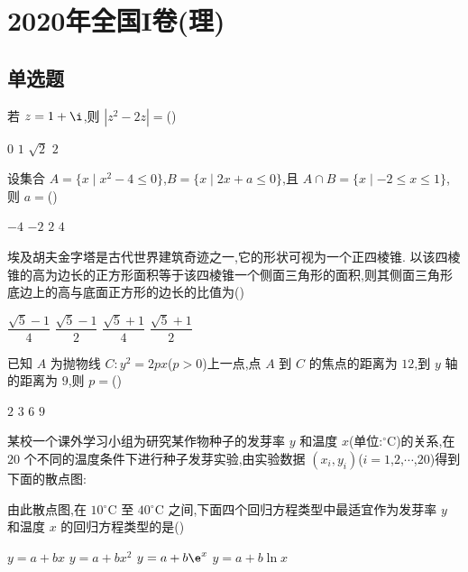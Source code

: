 \chapter{2020年全国I卷(理)}

\section{单选题}

\begin{problem}
若 \(z=1+\i\),则 \(\left\lvert z^2-2z \right\rvert=\)(\quad)

\choices
    {\(0\)}
    {\(1\)}
    {\(\sqrt{2}\)}
    {\(2\)}

\end{problem}

\begin{problem}
设集合 \(A=\{x\mid x^2-4\le 0\}\),\(B=\{x\mid 2x+a\le 0\}\),且 \(A\cap B=\{x\mid -2\le x\le 1\}\),则 \(a=\)(\quad)

\choices
    {\(-4\)}
    {\(-2\)}
    {\(2\)}
    {\(4\)}

\end{problem}

\begin{problem}
埃及胡夫金字塔是古代世界建筑奇迹之一,它的形状可视为一个正四棱锥. 以该四棱锥的高为边长的正方形面积等于该四棱锥一个侧面三角形的面积,则其侧面三角形底边上的高与底面正方形的边长的比值为(\quad)


\choices
    {\(\dfrac{\sqrt{5}-1}{4}\)}
    {\(\dfrac{\sqrt{5}-1}{2}\)}
    {\(\dfrac{\sqrt{5}+1}{4}\)}
    {\(\dfrac{\sqrt{5}+1}{2}\)}

\end{problem}

\begin{problem}
已知 \(A\) 为抛物线 \(C:y^2=2px\)(\(p>0\))上一点,点 \(A\) 到 \(C\) 的焦点的距离为 \(12\),到 \(y\) 轴的距离为 \(9\),则 \(p=\)(\quad)

\choices
    {\(2\)}
    {\(3\)}
    {\(6\)}
    {\(9\)}

\end{problem}

\begin{problem}
某校一个课外学习小组为研究某作物种子的发芽率 \(y\) 和温度 \(x\)(单位:\({}^\circ\mathrm{C}\))的关系,在 \(20\) 个不同的温度条件下进行种子发芽实验,由实验数据 \(\left( x_i,y_i \right)\)(\(i=1\),\(2\),\(\cdots\),\(20\))得到下面的散点图:


由此散点图,在 \(10{}^\circ\mathrm{C}\) 至 \(40{}^\circ\mathrm{C}\) 之间,下面四个回归方程类型中最适宜作为发芽率 \(y\) 和温度 \(x\) 的回归方程类型的是(\quad)

\choices
    {\(y=a+bx\)}
    {\(y=a+bx^2\)}
    {\(y=a+b\e^x\)}
    {\(y=a+b\ln x\)}

\end{problem}

